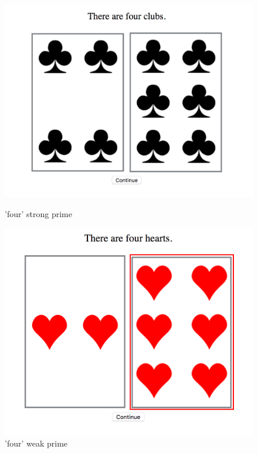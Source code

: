 \documentclass[]{article}
\begin{document}
\begin{figure}[h]
\centering
\begin{minipage}[b]{0.3\textwidth}
\includegraphics[width=\textwidth]{four_strong.png} 
\caption{'four' strong prime}
\end{minipage}
\begin{minipage}[b]{0.3\textwidth}

\includegraphics[width=\textwidth]{four_weak.png} 
\caption{'four' weak prime}
\end{minipage}
\begin{minipage}[b]{0.3\textwidth}


\end{minipage}
\end{figure}
\end{document}
